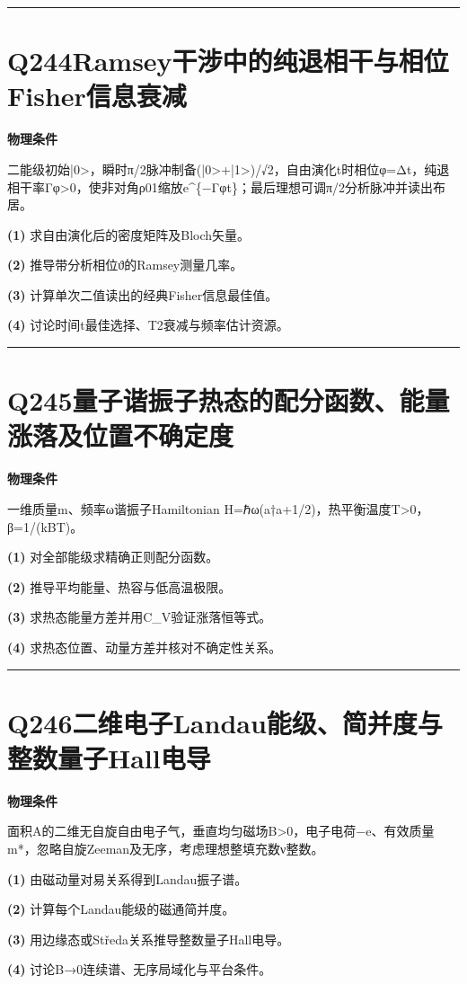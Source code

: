 \documentclass[UTF8,a4paper,11pt,oneside,openany]{ctexbook}
\begin{document}
\par\bigskip\hrule\bigskip
\section*{Q244\quad Ramsey干涉中的纯退相干与相位Fisher信息衰减}
\textbf{物理条件}\par 二能级初始|0>，瞬时π/2脉冲制备(|0>+|1>)/√2，自由演化t时相位φ=Δt，纯退相干率Γφ>0，使非对角ρ01缩放e\textasciicircum{}\{−Γφt\}；最后理想可调π/2分析脉冲并读出布居。
\par\noindent\textbf{(1)} 求自由演化后的密度矩阵及Bloch矢量。
\par\noindent\textbf{(2)} 推导带分析相位ϑ的Ramsey测量几率。
\par\noindent\textbf{(3)} 计算单次二值读出的经典Fisher信息最佳值。
\par\noindent\textbf{(4)} 讨论时间t最佳选择、T2衰减与频率估计资源。

\par\bigskip\hrule\bigskip
\section*{Q245\quad 量子谐振子热态的配分函数、能量涨落及位置不确定度}
\textbf{物理条件}\par 一维质量m、频率ω谐振子Hamiltonian H=ℏω(a†a+1/2)，热平衡温度T>0，β=1/(kBT)。
\par\noindent\textbf{(1)} 对全部能级求精确正则配分函数。
\par\noindent\textbf{(2)} 推导平均能量、热容与低高温极限。
\par\noindent\textbf{(3)} 求热态能量方差并用C\_V验证涨落恒等式。
\par\noindent\textbf{(4)} 求热态位置、动量方差并核对不确定性关系。

\par\bigskip\hrule\bigskip
\section*{Q246\quad 二维电子Landau能级、简并度与整数量子Hall电导}
\textbf{物理条件}\par 面积A的二维无自旋自由电子气，垂直均匀磁场B>0，电子电荷−e、有效质量m*，忽略自旋Zeeman及无序，考虑理想整填充数ν整数。
\par\noindent\textbf{(1)} 由磁动量对易关系得到Landau振子谱。
\par\noindent\textbf{(2)} 计算每个Landau能级的磁通简并度。
\par\noindent\textbf{(3)} 用边缘态或Středa关系推导整数量子Hall电导。
\par\noindent\textbf{(4)} 讨论B→0连续谱、无序局域化与平台条件。
\end{document}
